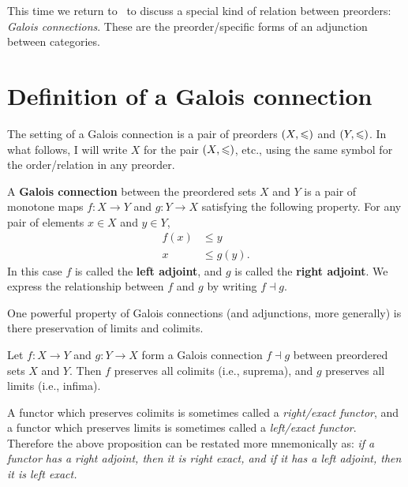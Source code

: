 \documentclass[../main.tex]{subfiles}
\begin{document}

\makehmtitle%

This time we return to~\cite{Fong2019} to discuss a special kind of relation
between preorders: \emph{Galois connections}. These are the preorder\-/specific
forms of an adjunction between categories.

\section{Definition of a Galois connection}

The setting of a Galois connection is a pair of preorders \({\left(X,\leqslant\right)}\) and
\({\left(Y,\leqslant\right)}\). In what follows, I will write \(X\) for the pair
\({\left(X,\leqslant\right)}\), etc., using the same symbol for the order\-/relation in any
preorder.
\begin{definition}
  A \textbf{Galois connection} between the preordered sets \(X\) and \(Y\) is a
  pair of monotone maps \(f: X \to Y\) and \(g: Y \to X\) satisfying the
  following property. For any pair of elements \(x \in X\) and \(y \in Y\),
  \[%
    \begin{array}{rl}
      f(x) &\leq y \\\hline\hline
      x &\leq g(y).
    \end{array}
  \]%
  In this case \(f\) is called the \textbf{left adjoint}, and \(g\) is called
  the \textbf{right adjoint}. We express the relationship between \(f\) and
  \(g\) by writing \(f \dashv g\).
\end{definition}
One powerful property of Galois connections (and adjunctions, more generally) is
there preservation of limits and colimits.
\begin{proposition}\label{prop:adjoints-preserve-limits}
  Let \(f: X \to Y\) and \(g: Y \to X\) form a Galois connection \(f \dashv g\)
  between preordered sets \(X\) and \(Y\). Then \(f\) preserves all colimits (i.e.,
  suprema), and \(g\) preserves all limits (i.e., infima).
\end{proposition}
\begin{remark}
  A functor which preserves colimits is sometimes called a \emph{right\-/exact
    functor}, and a functor which preserves limits is sometimes called a
  \emph{left\-/exact functor}. Therefore the above proposition can be restated
  more mnemonically as: \emph{if a functor has a right adjoint, then it
    is right exact, and if it has a left adjoint, then it is left exact.} 
\end{remark}
\end{document}
